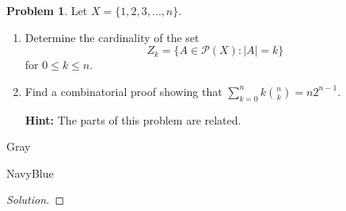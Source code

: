 \documentclass[12pt]{amsart}
\newcounter{problem_number}[section]
\theoremstyle{named}
\newenvironment{soln}
{\begin{color}{Gray}\begin{framed}\begin{color}{NavyBlue}\begin{proof}[Solution]
\doublespacing}
{\end{proof}\end{color}\end{framed}\end{color}}
\theoremstyle{definition}
\newtheorem{problem}{Problem}
\begin{document}
\phantom{ }

\phantom{ }

\phantom{ }

\phantom{ }

\phantom{ }

\phantom{ }

\phantom{ }

\phantom{ }

\phantom{ }

\phantom{ }

\phantom{ }

\begin{problem}
	Let $X=\{1,2,3,\ldots,n\}$.
	\begin{enumerate}
		\item Determine the cardinality of the set 
		$$Z_k = \{A\in\mathscr{P}(X)\colon |A|=k\}$$
		for $0\leq k\leq n$.
	\item Find a combinatorial proof showing that $\displaystyle\sum_{k=0}^nk\binom{n}{k} = n2^{n-1}$.

	\textbf{Hint:} The parts of this problem are related.
	\end{enumerate}
\end{problem}

\begin{soln}

\end{soln}
\end{document}
